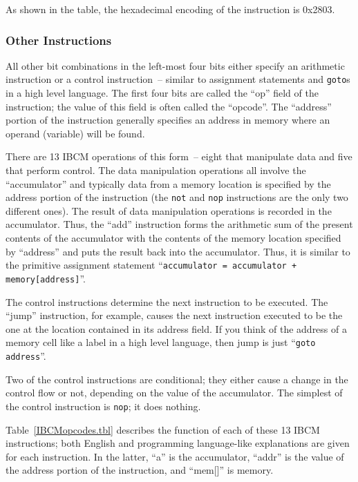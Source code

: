 As shown in the table, the hexadecimal encoding of the instruction is 0x2803.

\subsubsection{Other Instructions}

All other bit combinations in the left-most four bits either specify
an arithmetic instruction or a control instruction~-- similar to
assignment statements and {\tt goto}s in a high level language. The first four
bits are called the ``op'' field of the instruction; the value of this
field is often called the ``opcode''. The ``address'' portion of the
instruction generally specifies an address in memory where an operand
(variable) will be found.

There are 13 IBCM operations of this form~-- eight that manipulate
data and five that perform control. The data manipulation operations
all involve the ``accumulator'' and typically data from a memory
location is specified by the address portion of the instruction (the
{\tt not} and {\tt nop} instructions are the only two different ones).
The result of data manipulation operations is recorded in the
accumulator.  Thus, the ``add'' instruction forms the arithmetic sum
of the present contents of the accumulator with the contents of the
memory location specified by ``address'' and puts the result back into
the accumulator. Thus, it is similar to the primitive assignment
statement ``{\tt accumulator = accumulator + memory[address]}''.

The control instructions determine the next instruction to be
executed. The ``jump'' instruction, for example, causes the next
instruction executed to be the one at the location contained in its
address field. If you think of the address of a memory cell like a
label in a high level language, then jump is just ``{\tt goto
  address}''.

Two of the control instructions are conditional; they either cause a
change in the control flow or not, depending on the value of the
accumulator. The simplest of the control instruction is {\tt nop}; it
does nothing.

Table~\ref{IBCMopcodes.tbl} describes the function of each of these 13
IBCM instructions; both English and programming language-like
explanations are given for each instruction. In the latter, ``a'' is
the accumulator, ``addr'' is the value of the address portion of the
instruction, and ``mem[]'' is memory.

